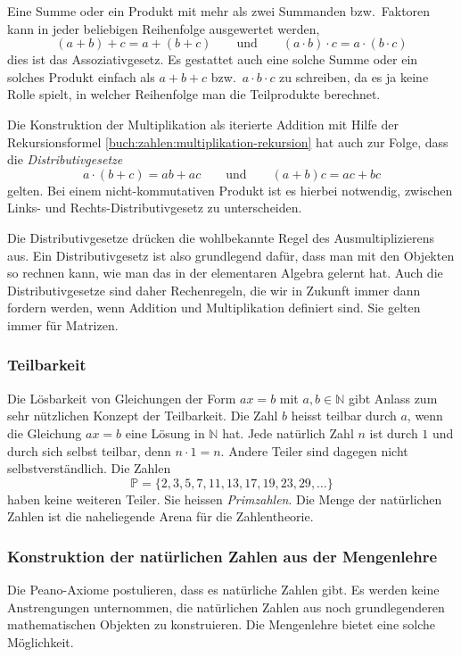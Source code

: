 Eine Summe oder ein Produkt mit mehr als zwei Summanden bzw.~Faktoren
kann in jeder beliebigen Reihenfolge ausgewertet werden,
\[
(a+b)+c
=
a+(b+c)
\qquad\text{und}\qquad
(a\cdot b)\cdot c
=
a\cdot (b\cdot c)
\]
dies ist das Assoziativgesetz.
Es gestattet auch eine solche Summe oder ein solches Produkt einfach
als $a+b+c$ bzw.~$a\cdot b\cdot c$ zu schreiben, da es ja keine Rolle
spielt, in welcher Reihenfolge man die Teilprodukte berechnet.

Die Konstruktion der Multiplikation als iterierte Addition mit Hilfe
der Rekursionsformel \eqref{buch:zahlen:multiplikation-rekursion}
hat auch zur Folge, dass die {\em Distributivgesetze}
\[
a\cdot(b+c) = ab+ac
\qquad\text{und}\qquad
(a+b)c = ac+bc
\]
gelten.
Bei einem nicht-kommutativen Produkt ist es hierbei notwendig,
zwischen Links- und Rechts-Distributivgesetz zu unterscheiden.

Die Distributivgesetze drücken die wohlbekannte Regel des
Ausmultiplizierens aus.
Ein Distributivgesetz ist also grundlegend dafür, dass man mit den
Objekten so rechnen kann, wie man das in der elementaren Algebra 
gelernt hat.
Auch die Distributivgesetze sind daher Rechenregeln, die wir in
Zukunft immer dann fordern werden, wenn Addition und Multiplikation
definiert sind.
Sie gelten immer für Matrizen.

\subsubsection{Teilbarkeit}
Die Lösbarkeit von Gleichungen der Form $ax=b$ mit $a,b\in\mathbb{N}$
gibt Anlass zum sehr nützlichen Konzept der Teilbarkeit.
%
Die Zahl $b$ heisst teilbar durch $a$, wenn die Gleichung $ax=b$ eine
Lösung in $\mathbb{N}$ hat.
%
Jede natürlich Zahl $n$ ist durch $1$ und durch sich selbst teilbar,
denn $n\cdot 1 = n$.
Andere Teiler sind dagegen nicht selbstverständlich.
Die Zahlen
\[
\mathbb{P}
=
\{2,3,5,7,11,13,17,19,23,29,\dots\}
\]
haben keine weiteren Teiler. Sie heissen {\em Primzahlen}.
%
Die Menge der natürlichen Zahlen ist die naheliegende Arena
für die Zahlentheorie.
%

\subsubsection{Konstruktion der natürlichen Zahlen aus der Mengenlehre}
Die Peano-Axiome postulieren, dass es natürliche Zahlen gibt.
Es werden keine Anstrengungen unternommen, die natürlichen Zahlen
aus noch grundlegenderen mathematischen Objekten zu konstruieren.
Die Mengenlehre bietet eine solche Möglichkeit.

